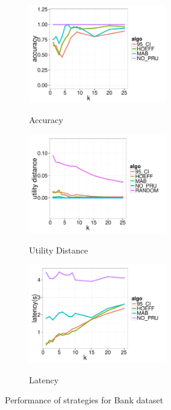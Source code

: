 \begin{figure}[t]
	\centering
	\begin{subfigure}{0.33\linewidth}
		\centering
		{\includegraphics[width=6cm] {Images/in_memory_bank_accuracy.pdf}}
		\caption{Accuracy}
		\label{fig:bank_accuracy}
	\end{subfigure}
	\begin{subfigure}{0.33\linewidth}
		\centering
		{\includegraphics[width=6cm] {Images/in_memory_bank_utility_dist.pdf}}
		\caption{Utility Distance}
		\label{fig:bank_utility_dist}
	\end{subfigure}
	\begin{subfigure}{0.33\linewidth}
		\centering
		{\includegraphics[width=6cm] {Images/in_memory_bank_latency.pdf}}
		\caption{Latency}
		\label{fig:bank_latency}
	\end{subfigure}
	\vspace{-10pt}
	\caption{Performance of strategies for Bank dataset}
	\label{fig:bank_perf}
	\vspace{-10pt}
\end{figure}

